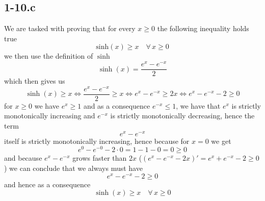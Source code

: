 \documentclass{article}
\begin{document}
\subsection*{1-10.c}
We are tasked with proving that for every $x \geq 0$ the following inequality holds true
\begin{equation*}
    \text{sinh}\left(x\right) \geq x \quad \forall\,x \geq 0
\end{equation*}
we then use the definition of $\sinh$
\begin{equation*}
    \sinh\left(x\right) = \frac{e^{x}-e^{-x}}{2}
\end{equation*}
which then gives us
\begin{equation*}
    \sinh\left(x\right) \geq x \Longleftrightarrow \frac{e^{x}-e^{-x}}{2} \geq x \Longleftrightarrow e^{x}-e^{-x} \geq 2x \Longleftrightarrow e^{x} - e^{-x} - 2 \geq 0
\end{equation*}
for $x \geq 0$ we have $e^{x} \geq 1$ and as a consequence $e^{-x} \leq 1$, we have that $e^{x}$ is strictly monotonically increasing and $e^{-x}$ is strictly monotonically decreasing, hence the term
\begin{equation*}
    e^{x} - e^{-x}
\end{equation*}
itself is strictly monotonically increasing, hence because for $x = 0$ we get
\begin{equation*}
    e^{0}-e^{-0} - 2 \cdot 0 = 1 - 1 - 0 = 0 \geq 0
\end{equation*}
and because $e^{x} - e^{-x}$ grows faster than $2x$ ($\left(e^{x}-e^{-x} -2x\right)' = e^{x} + e^{-x} -2 \geq 0$) we can conclude that we always must have 
\begin{equation*}
    e^{x} - e^{-x} - 2 \geq 0
\end{equation*}
and hence as a consequence
\begin{equation*}
    \sinh\left(x\right) \geq x \quad \forall\, x \geq 0
\end{equation*}
\end{document}
